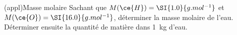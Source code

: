 \documentclass[../../main/main.tex]{subfiles}
\begin{document}

\begin{tcb}[label=exem:massemol, breakable](appl){Masse molaire}
	Sachant que $M(\ce{H}) = \SI{1.0}{g.mol^{-1}}$ et $M(\ce{O}) =
		\SI{16.0}{g.mol^{-1}}$, déterminer la masse molaire de l'eau. Déterminer
	ensuite la quantité de matière dans \SI{1}{kg} d'eau.
	\tcblower

	\begin{isd}
		\tcblower
	\end{isd}
\end{tcb}
\end{document}
